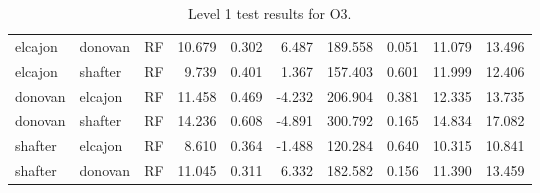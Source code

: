 \begin{table}[h]
\begin{tabular}{lllrrrrrrr}
elcajon & donovan & RF & 10.679 & 0.302 & 6.487 & 189.558 & 0.051 & 11.079 & 13.496\\
elcajon & shafter & RF & 9.739 & 0.401 & 1.367 & 157.403 & 0.601 & 11.999 & 12.406\\
donovan & elcajon & RF & 11.458 & 0.469 & -4.232 & 206.904 & 0.381 & 12.335 & 13.735\\
donovan & shafter & RF & 14.236 & 0.608 & -4.891 & 300.792 & 0.165 & 14.834 & 17.082\\
shafter & elcajon & RF & 8.610 & 0.364 & -1.488 & 120.284 & 0.640 & 10.315 & 10.841\\
shafter & donovan & RF & 11.045 & 0.311 & 6.332 & 182.582 & 0.156 & 11.390 & 13.459\\
\bottomrule
\end{tabular}
\caption{Level 1 test results for O3.}
\end{table}
